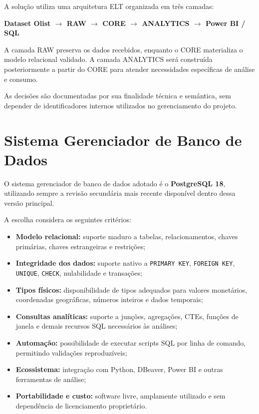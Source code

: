 \documentclass[12pt,a4paper]{article}
\begin{document}
	A solução utiliza uma arquitetura ELT organizada em três camadas:
	
	\begin{center}
		\textbf{
			Dataset Olist
			$\rightarrow$
			RAW
			$\rightarrow$
			CORE
			$\rightarrow$
			ANALYTICS
			$\rightarrow$
			Power BI / SQL
		}
	\end{center}
	
	A camada RAW preserva os dados recebidos, enquanto o CORE materializa
	o modelo relacional validado. A camada ANALYTICS será construída
	posteriormente a partir do CORE para atender necessidades específicas
	de análise e consumo.
	
	As decisões são documentadas por sua finalidade técnica e semântica,
	sem depender de identificadores internos utilizados no gerenciamento
	do projeto.
	
	\section{Sistema Gerenciador de Banco de Dados}
	
	O sistema gerenciador de banco de dados adotado é o
	\textbf{PostgreSQL 18}, utilizando sempre a revisão secundária mais
	recente disponível dentro dessa versão principal.
	
	A escolha considera os seguintes critérios:
	
	\begin{itemize}[leftmargin=1.2cm]
		
		\item \textbf{Modelo relacional:}
		suporte maduro a tabelas, relacionamentos, chaves primárias,
		chaves estrangeiras e restrições;
		
		\item \textbf{Integridade dos dados:}
		suporte nativo a \texttt{PRIMARY KEY}, \texttt{FOREIGN KEY},
		\texttt{UNIQUE}, \texttt{CHECK}, nulabilidade e transações;
		
		\item \textbf{Tipos físicos:}
		disponibilidade de tipos adequados para valores monetários,
		coordenadas geográficas, números inteiros e dados temporais;
		
		\item \textbf{Consultas analíticas:}
		suporte a junções, agregações, CTEs, funções de janela e demais
		recursos SQL necessários às análises;
		
		\item \textbf{Automação:}
		possibilidade de executar scripts SQL por linha de comando,
		permitindo validações reproduzíveis;
		
		\item \textbf{Ecossistema:}
		integração com Python, DBeaver, Power BI e outras ferramentas
		de análise;
		
		\item \textbf{Portabilidade e custo:}
		software livre, amplamente utilizado e sem dependência de
		licenciamento proprietário.
		
	\end{itemize}
	
\end{document}
